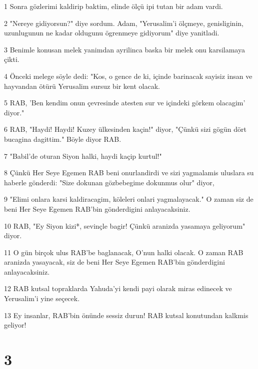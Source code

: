 \par 1 Sonra gözlerimi kaldirip baktim, elinde ölçü ipi tutan bir adam vardi.
\par 2 "Nereye gidiyorsun?" diye sordum. Adam, "Yerusalim'i ölçmeye, genisliginin, uzunlugunun ne kadar oldugunu ögrenmeye gidiyorum" diye yanitladi.
\par 3 Benimle konusan melek yanimdan ayrilinca baska bir melek onu karsilamaya çikti.
\par 4 Önceki melege söyle dedi: "Kos, o gence de ki, içinde barinacak sayisiz insan ve hayvandan ötürü Yerusalim sursuz bir kent olacak.
\par 5 RAB, 'Ben kendim onun çevresinde atesten sur ve içindeki görkem olacagim' diyor."
\par 6 RAB, "Haydi! Haydi! Kuzey ülkesinden kaçin!" diyor, "Çünkü sizi gögün dört bucagina dagittim." Böyle diyor RAB.
\par 7 "Babil'de oturan Siyon halki, haydi kaçip kurtul!"
\par 8 Çünkü Her Seye Egemen RAB beni onurlandirdi ve sizi yagmalamis uluslara su haberle gönderdi: "Size dokunan gözbebegime dokunmus olur" diyor,
\par 9 "Elimi onlara karsi kaldiracagim, köleleri onlari yagmalayacak." O zaman siz de beni Her Seye Egemen RAB'bin gönderdigini anlayacaksiniz.
\par 10 RAB, "Ey Siyon kizi*, sevinçle bagir! Çünkü aranizda yasamaya geliyorum" diyor.
\par 11 O gün birçok ulus RAB'be baglanacak, O'nun halki olacak. O zaman RAB aranizda yasayacak, siz de beni Her Seye Egemen RAB'bin gönderdigini anlayacaksiniz.
\par 12 RAB kutsal topraklarda Yahuda'yi kendi payi olarak miras edinecek ve Yerusalim'i yine seçecek.
\par 13 Ey insanlar, RAB'bin önünde sessiz durun! RAB kutsal konutundan kalkmis geliyor!

\chapter{3}

